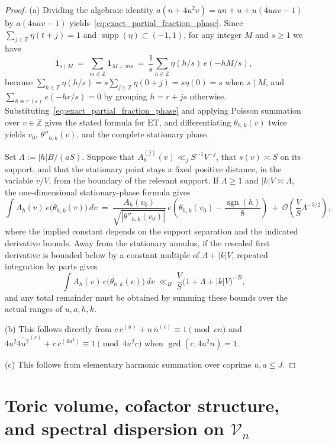 \documentclass[11pt, a4paper]{article}
\theoremstyle{plain}
\theoremstyle{definition}
\newcommand{\Z}{\mathbb{Z}}
\begin{document}
\begin{proof}
(a) Dividing the algebraic identity $a(n+4u^{2}v)=an+u+u(4uav-1)$ by $a(4uav-1)$ yields~\eqref{eq:exact_partial_fraction_phase}. Since $\sum_{j\in\Z}\eta(t+j)=1$ and $\operatorname{supp}(\eta)\subset(-1,1)$, for any integer $M$ and $s\ge1$ we have
\[
\mathbf{1}_{s\mid M}\ =\ \sum_{m\in\Z}\mathbf{1}_{M=ms}\ =\ \frac{1}{s}\sum_{h\in\Z}\eta(h/s)\,e(-hM/s),
\]
because $\sum_{h\in\Z}\eta(h/s)=s\sum_{j\in\Z}\eta(0+j)=s\eta(0)=s$ when $s\mid M$, and $\sum_{h\equiv r\ (s)}e(-hr/s)=0$ by grouping $h=r+js$ otherwise. Substituting~\eqref{eq:exact_partial_fraction_phase} and applying Poisson summation over $v\in\Z$ gives the stated formula for $\mathrm{ET}$, and differentiating $\theta_{h,k}(v)$ twice yields $v_0$, $\theta''_{h,k}(v)$, and the complete stationary phase.

Set $\Lambda:=|h|B/(aS)$. Suppose that $A_h^{(j)}(v)\ll_j S^{-1}V^{-j}$, that $s(v)\asymp S$ on its support, and that the stationary point stays a fixed positive distance, in the variable $v/V$, from the boundary of the relevant support. If $\Lambda\ge1$ and $|k|V\asymp\Lambda$, the one-dimensional stationary-phase formula gives
\[
\int A_h(v)\,e\big(\theta_{h,k}(v)\big)\,dv\ =\ \frac{A_h(v_0)}{\sqrt{|\theta''_{h,k}(v_0)|}}\,e\!\left(\theta_{h,k}(v_0)-\frac{\operatorname{sgn}(h)}{8}\right)\ +\ \mathcal{O}\!\left(\frac{V}{S}\Lambda^{-3/2}\right),
\]
where the implied constant depends on the support separation and the indicated derivative bounds. Away from the stationary annulus, if the rescaled first derivative is bounded below by a constant multiple of $\Lambda+|k|V$, repeated integration by parts gives
\[
\int A_h(v)\,e\big(\theta_{h,k}(v)\big)\,dv\ \ll_B\ \frac{V}{S}\big(1+\Lambda+|k|V\big)^{-B},
\]
and any total remainder must be obtained by summing these bounds over the actual ranges of $u,a,h,k$.

(b) This follows directly from $c\,\overline{c}^{(n)}+n\,\overline{n}^{(c)}\equiv1\pmod{cn}$ and $4u^{2}\overline{4u^{2}}^{(c)}+c\,\overline{c}^{(4u^{2})}\equiv1\pmod{4u^{2}c}$ when $\gcd(c,4u^{2}n)=1$.

(c) This follows from elementary harmonic summation over coprime $u,a\le J$.
\end{proof}

\section{Toric volume, cofactor structure, and spectral dispersion on $\mathcal{V}_n$}\label{sec:toric_volume_barrier}
\end{document}
